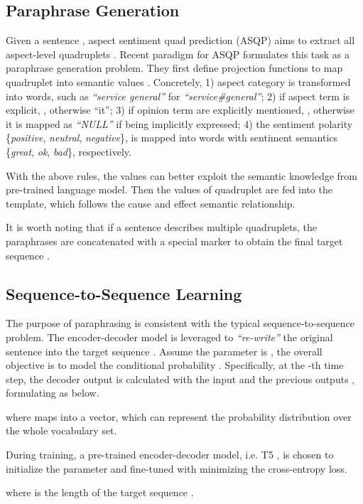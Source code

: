 \documentclass[11pt]{article}
\begin{document}
\subsection{Paraphrase Generation}
Given a sentence , aspect sentiment quad prediction (ASQP) aims to extract all aspect-level quadruplets . Recent paradigm for ASQP \cite{zhang-etal-2021-aspect-sentiment} formulates this task as a paraphrase generation problem. They first define projection functions to map quadruplet  into semantic values . Concretely, 1) aspect category  is transformed into words, such as \emph{``service general''} for \emph{``service\#general''}; 2) if aspect term  is explicit, , otherwise ``it''; 3) if opinion term  are explicitly mentioned, , otherwise it is mapped as \emph{``NULL''} if being implicitly expressed; 4) the sentiment polarity  \{\emph{positive}, \emph{neutral}, \emph{negative}\}, is mapped into words with sentiment semantics \{\emph{great}, \emph{ok}, \emph{bad}\}, respectively.

With the above rules, the values can better exploit the semantic knowledge from pre-trained language model. Then the values of quadruplet are fed into the template, which follows the cause and effect semantic relationship.


It is worth noting that if a sentence describes multiple quadruplets, the paraphrases are concatenated with a special marker  to obtain the final target sequence .

\subsection{Sequence-to-Sequence Learning}
The purpose of paraphrasing is consistent with the typical sequence-to-sequence problem. The encoder-decoder model is leveraged to \emph{``re-write''} the original sentence  into the target sequence . Assume the parameter is , the overall objective is to model the conditional probability . Specifically, at the -th time step, the decoder output  is calculated with the input  and the previous outputs , formulating as below.

where  maps  into a vector, which can represent the probability distribution over the whole vocabulary set.



During training, a pre-trained encoder-decoder model, i.e. T5 \cite{JMLR:v21:20-074}, is chosen to initialize the parameter  and fine-tuned with minimizing the cross-entropy loss.

where  is the length of the target sequence .
\end{document}
